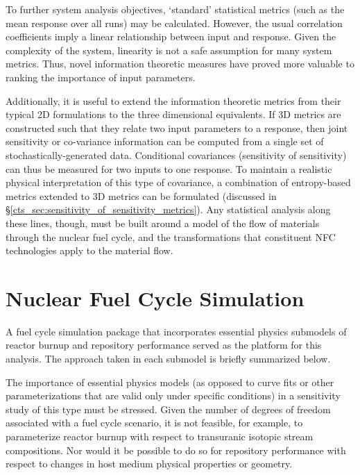 To further system analysis objectives, `standard' statistical metrics (such as the mean response
over all runs) may be calculated.  However, the usual correlation coefficients imply a linear
relationship between input and response.  Given the complexity of the system, linearity is not
a safe assumption for many system metrics.  Thus, novel information theoretic measures have
proved more valuable to ranking the importance of input parameters.

Additionally, it is useful to extend the information theoretic metrics from their typical 2D
formulations to the three dimensional equivalents.  If 3D metrics are constructed such that
they relate two input parameters to a response, then joint sensitivity or co-variance information
can be computed from a single set of stochastically-generated data.  Conditional covariances
(sensitivity of sensitivity) can thus be measured for two inputs to one response.
To maintain a realistic physical interpretation of this type of covariance, a combination of
entropy-based metrics extended to 3D metrics can be formulated  (discussed in
\S \ref{cts_sec:sensitivity_of_sensitivity_metrics}).  Any statistical analysis along these lines, though,
must be built around a model of the flow of materials through the nuclear fuel cycle, and the
transformations that constituent NFC technologies apply to the material flow.




\section{Nuclear Fuel Cycle Simulation}
\label{cts_sec:nfcsim}

A fuel cycle simulation package that incorporates essential physics submodels of reactor burnup 
\cite{Scopatz2009} and repository performance \cite{Li2009} served as the platform for this analysis. 
The approach taken in each submodel is briefly summarized below. 

The importance of essential physics models (as opposed to curve fits or other parameterizations that are valid
only under specific conditions) in a sensitivity study of this type must be stressed. Given the number of
degrees of freedom associated with a fuel cycle scenario, it is not feasible, for example, to parameterize
reactor burnup with respect to transuranic isotopic stream compositions. Nor would it be possible to do
so for repository performance with respect to changes in host medium physical properties or geometry.

